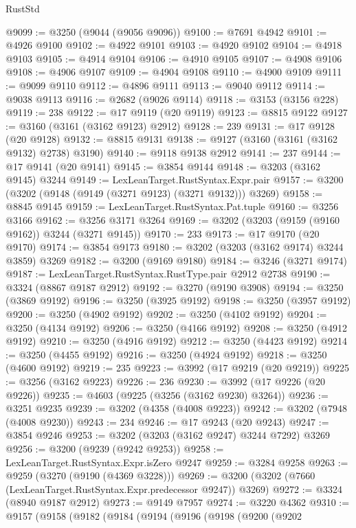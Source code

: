 \begin{lexlean}{RustStd}
\begin{coremodule}
@9099 := @3250 (@9044 (@9056 @9096))
@9100 := @7691 @4942
@9101 := @4926 @9100
@9102 := @4922 @9101
@9103 := @4920 @9102
@9104 := @4918 @9103
@9105 := @4914 @9104
@9106 := @4910 @9105
@9107 := @4908 @9106
@9108 := @4906 @9107
@9109 := @4904 @9108
@9110 := @4900 @9109
@9111 := @9099 @9110
@9112 := @4896 @9111
@9113 := @9040 @9112
@9114 := @9038 @9113
@9116 := @2682 (@9026 @9114)
@9118 := @3153 (@3156 @228)
@9119 := 238
@9122 := @17 @9119 (@20 @9119)
@9123 := @8815 @9122
@9127 := @3160 (@3161 (@3162 @9123) @2912)
@9128 := 239
@9131 := @17 @9128 (@20 @9128)
@9132 := @8815 @9131
@9138 := @9127 (@3160 (@3161 (@3162 @9132) @2738) @3190)
@9140 := @9118 @9138 @2912
@9141 := 237
@9144 := @17 @9141 (@20 @9141)
@9145 := @3854 @9144
@9148 := @3203 (@3162 @9145) @3244
@9149 := LexLeanTarget.RustSyntax.Expr.pair
@9157 := @3200 (@3202 (@9148 (@9149 (@3271 @9123) (@3271 @9132))) @3269)
@9158 := @8845 @9145
@9159 := LexLeanTarget.RustSyntax.Pat.tuple
@9160 := @3256 @3166
@9162 := @3256 @3171 @3264
@9169 := @3202 (@3203 (@9159 (@9160 @9162)) @3244 (@3271 @9145))
@9170 := 233
@9173 := @17 @9170 (@20 @9170)
@9174 := @3854 @9173
@9180 := @3202 (@3203 (@3162 @9174) @3244 @3859) @3269
@9182 := @3200 (@9169 @9180)
@9184 := @3246 (@3271 @9174)
@9187 := LexLeanTarget.RustSyntax.RustType.pair @2912 @2738
@9190 := @3324 (@8867 @9187 @2912)
@9192 := @3270 (@9190 @3908)
@9194 := @3250 (@3869 @9192)
@9196 := @3250 (@3925 @9192)
@9198 := @3250 (@3957 @9192)
@9200 := @3250 (@4902 @9192)
@9202 := @3250 (@4102 @9192)
@9204 := @3250 (@4134 @9192)
@9206 := @3250 (@4166 @9192)
@9208 := @3250 (@4912 @9192)
@9210 := @3250 (@4916 @9192)
@9212 := @3250 (@4423 @9192)
@9214 := @3250 (@4455 @9192)
@9216 := @3250 (@4924 @9192)
@9218 := @3250 (@4600 @9192)
@9219 := 235
@9223 := @3992 (@17 @9219 (@20 @9219))
@9225 := @3256 (@3162 @9223)
@9226 := 236
@9230 := @3992 (@17 @9226 (@20 @9226))
@9235 := @4603 (@9225 (@3256 (@3162 @9230) @3264))
@9236 := @3251 @9235
@9239 := @3202 (@4358 (@4008 @9223))
@9242 := @3202 (@7948 (@4008 @9230))
@9243 := 234
@9246 := @17 @9243 (@20 @9243)
@9247 := @3854 @9246
@9253 := @3202 (@3203 (@3162 @9247) @3244 @7292) @3269
@9256 := @3200 (@9239 (@9242 @9253))
@9258 := LexLeanTarget.RustSyntax.Expr.isZero @9247
@9259 := @3284 @9258
@9263 := @9259 (@3270 (@9190 (@4369 @3228)))
@9269 := @3200 (@3202 (@7660 (LexLeanTarget.RustSyntax.Expr.predecessor @9247)) @3269)
@9272 := @3324 (@8940 @9187 @2912)
@9273 := @9149 @7957
@9274 := @3220 @4362
@9310 := @9157
    (@9158
      (@9182
        (@9184
          (@9194
            (@9196
              (@9198
                (@9200
                  (@9202

\end{coremodule}
\end{lexlean}
